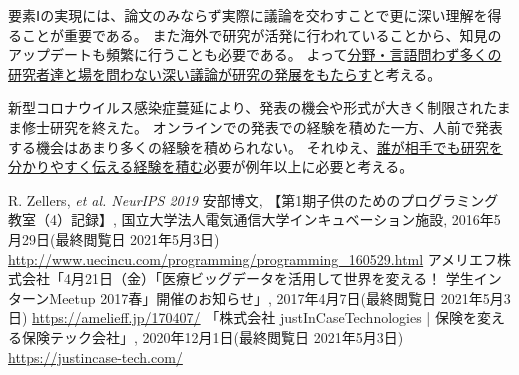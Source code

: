 要素Ⅰの実現には、論文のみならず実際に議論を交わすことで更に深い理解を得ることが重要である。
また海外で研究が活発に行われていることから、知見のアップデートも頻繁に行うことも必要である。
よって\underline{分野・言語問わず多くの研究者達と場を問わない深い議論が研究の発展をもたらす}と考える。

新型コロナウイルス感染症蔓延により、発表の機会や形式が大きく制限されたまま修士研究を終えた。
オンラインでの発表での経験を積めた一方、人前で発表する機会はあまり多くの経験を積められない。
それゆえ、\underline{誰が相手でも研究を分かりやすく伝える経験を積む}必要が例年以上に必要と考える。

{\footnotesize
	\begin{thebibliography}{99}
		\setcounter{enumiv}{13}
		 R. Zellers, \textit{et al. NeurIPS 2019}
         安部博文, 【第1期子供のためのプログラミング教室（4）記録】, 国立大学法人電気通信大学インキュベーション施設, 2016年5月29日(最終閲覧日 2021年5月3日) \url{http://www.uecincu.com/programming/programming_160529.html}
         アメリエフ株式会社「4月21日（金）「医療ビッグデータを活用して世界を変える！ 学生インターンMeetup 2017春」開催のお知らせ」, 2017年4月7日(最終閲覧日 2021年5月3日) \url{https://amelieff.jp/170407/}
         「株式会社 justInCaseTechnologies | 保険を変える保険テック会社」, 2020年12月1日(最終閲覧日 2021年5月3日) \url{https://justincase-tech.com/}
	\end{thebibliography}
}


